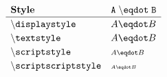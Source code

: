 \documentclass[varwidth, border = 3pt]{standalone}
\newcommand{\test}%
           {A \eqdot B}
\newcommand{\verbtest}%
           {A \mathmacro{eqdot} B}
\newcommand{\testmathstyle}{
  \[
    \renewcommand{\arraystretch}{1.2}%
    \begin{array}{lll}
        \textbf{Style}
      & \mathtt{\verbtest}
      \\ \hline
        \txtmacro{displaystyle}
      & \displaystyle \test
      \\
        \txtmacro{textstyle}
      & \textstyle \test
      \\
        \txtmacro{scriptstyle}
      & \scriptstyle \test
      \\
        \txtmacro{scriptscriptstyle}
      & \scriptscriptstyle \test
    \end{array}
  \]
}
\begin{document}
\testmathstyle
\end{document}
